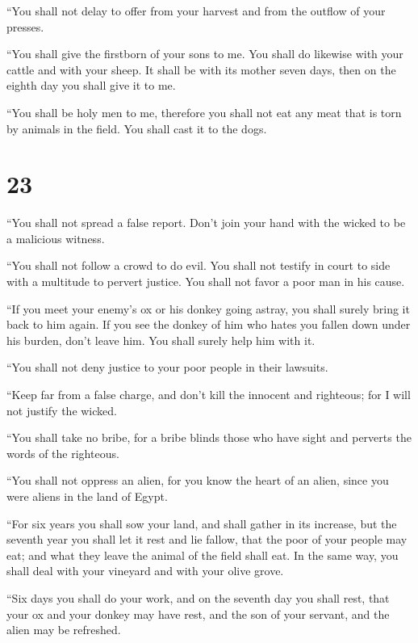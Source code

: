  ``You shall not delay to offer from your harvest and from
the outflow of your presses.

``You shall give the firstborn of your sons to me.  You
shall do likewise with your cattle and with your sheep. It shall be with
its mother seven days, then on the eighth day you shall give it to me.

 ``You shall be holy men to me, therefore you shall not eat
any meat that is torn by animals in the field. You shall cast it to the
dogs.

\hypertarget{section-22}{%
\section{23}\label{section-22}}

 ``You shall not spread a false report. Don't join your hand
with the wicked to be a malicious witness.

 ``You shall not follow a crowd to do evil. You shall not
testify in court to side with a multitude to pervert justice.
 You shall not favor a poor man in his cause.

 ``If you meet your enemy's ox or his donkey going astray,
you shall surely bring it back to him again.  If you see the
donkey of him who hates you fallen down under his burden, don't leave
him. You shall surely help him with it.

 ``You shall not deny justice to your poor people in their
lawsuits.

 ``Keep far from a false charge, and don't kill the innocent
and righteous; for I will not justify the wicked.

 ``You shall take no bribe, for a bribe blinds those who
have sight and perverts the words of the righteous.

 ``You shall not oppress an alien, for you know the heart of
an alien, since you were aliens in the land of Egypt.

 ``For six years you shall sow your land, and shall gather
in its increase,  but the seventh year you shall let it
rest and lie fallow, that the poor of your people may eat; and what they
leave the animal of the field shall eat. In the same way, you shall deal
with your vineyard and with your olive grove.

 ``Six days you shall do your work, and on the seventh day
you shall rest, that your ox and your donkey may have rest, and the son
of your servant, and the alien may be refreshed.

